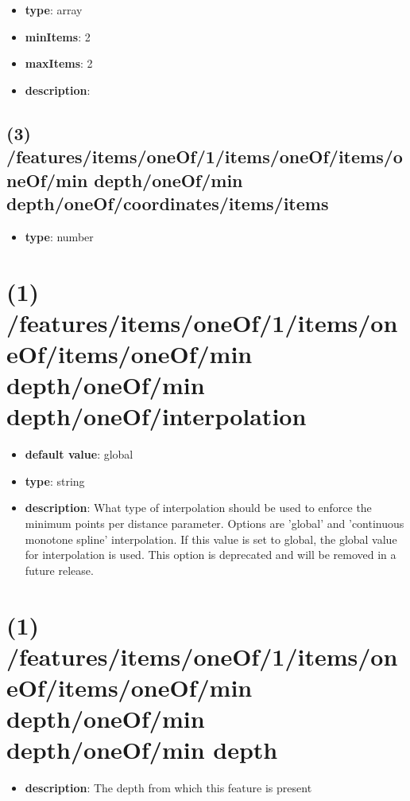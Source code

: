 \begin{itemize}[leftmargin=2em]\item {\bf type}: array
\item {\bf minItems}: 2
\item {\bf maxItems}: 2
\item {\bf description}: 
\end{itemize}\subsection{(3) /features/items/oneOf/1/items/oneOf/items/oneOf/min depth/oneOf/min depth/oneOf/coordinates/items/items}
\begin{itemize}[leftmargin=3em]\item {\bf type}: number
\end{itemize}\section{(1) /features/items/oneOf/1/items/oneOf/items/oneOf/min depth/oneOf/min depth/oneOf/interpolation}
\begin{itemize}[leftmargin=1em]\item {\bf default value}: global
\item {\bf type}: string
\item {\bf description}: What type of interpolation should be used to enforce the minimum points per distance parameter. Options are 'global' and 'continuous monotone spline' interpolation. If this value is set to global, the global value for interpolation is used. This option is deprecated and will be removed in a future release.
\end{itemize}\section{(1) /features/items/oneOf/1/items/oneOf/items/oneOf/min depth/oneOf/min depth/oneOf/min depth}
\begin{itemize}[leftmargin=1em]\item {\bf description}: The depth from which this feature is present
\end{itemize}
